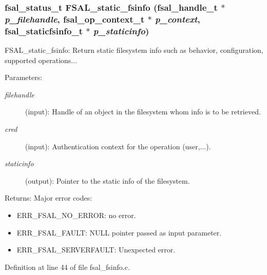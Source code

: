 \subsubsection{\setlength{\rightskip}{0pt plus 5cm}fsal\_\-status\_\-t FSAL\_\-static\_\-fsinfo (fsal\_\-handle\_\-t $\ast$ {\em p\_\-filehandle}, fsal\_\-op\_\-context\_\-t $\ast$ {\em p\_\-context}, fsal\_\-staticfsinfo\_\-t $\ast$ {\em p\_\-staticinfo})}\label{fsal__fsinfo_8c_a0}


FSAL\_\-static\_\-fsinfo: Return static filesystem info such as behavior, configuration, supported operations...

\begin{Desc}
\item[Parameters:]
\begin{description}
\item[{\em filehandle}](input): Handle of an object in the filesystem whom info is to be retrieved. \item[{\em cred}](input): Authentication context for the operation (user,...). \item[{\em staticinfo}](output): Pointer to the static info of the filesystem.\end{description}
\end{Desc}
\begin{Desc}
\item[Returns:]Major error codes:\begin{itemize}
\item ERR\_\-FSAL\_\-NO\_\-ERROR: no error.\item ERR\_\-FSAL\_\-FAULT: NULL pointer passed as input parameter.\item ERR\_\-FSAL\_\-SERVERFAULT: Unexpected error. \end{itemize}
\end{Desc}


Definition at line 44 of file fsal\_\-fsinfo.c.